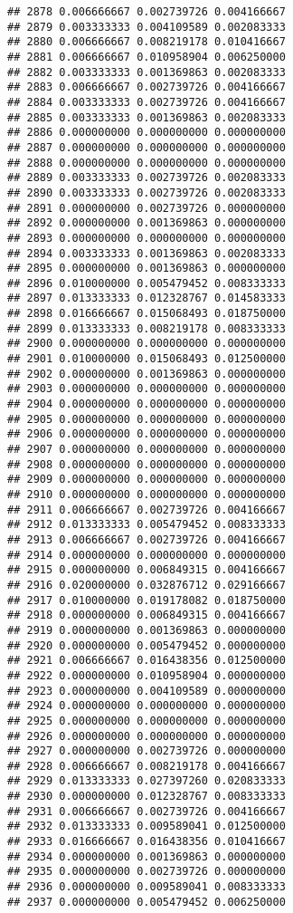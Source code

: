 \documentclass[
]{article}
\begin{document}
\begin{verbatim}
## 2878 0.006666667 0.002739726 0.004166667
## 2879 0.003333333 0.004109589 0.002083333
## 2880 0.006666667 0.008219178 0.010416667
## 2881 0.006666667 0.010958904 0.006250000
## 2882 0.003333333 0.001369863 0.002083333
## 2883 0.006666667 0.002739726 0.004166667
## 2884 0.003333333 0.002739726 0.004166667
## 2885 0.003333333 0.001369863 0.002083333
## 2886 0.000000000 0.000000000 0.000000000
## 2887 0.000000000 0.000000000 0.000000000
## 2888 0.000000000 0.000000000 0.000000000
## 2889 0.003333333 0.002739726 0.002083333
## 2890 0.003333333 0.002739726 0.002083333
## 2891 0.000000000 0.002739726 0.000000000
## 2892 0.000000000 0.001369863 0.000000000
## 2893 0.000000000 0.000000000 0.000000000
## 2894 0.003333333 0.001369863 0.002083333
## 2895 0.000000000 0.001369863 0.000000000
## 2896 0.010000000 0.005479452 0.008333333
## 2897 0.013333333 0.012328767 0.014583333
## 2898 0.016666667 0.015068493 0.018750000
## 2899 0.013333333 0.008219178 0.008333333
## 2900 0.000000000 0.000000000 0.000000000
## 2901 0.010000000 0.015068493 0.012500000
## 2902 0.000000000 0.001369863 0.000000000
## 2903 0.000000000 0.000000000 0.000000000
## 2904 0.000000000 0.000000000 0.000000000
## 2905 0.000000000 0.000000000 0.000000000
## 2906 0.000000000 0.000000000 0.000000000
## 2907 0.000000000 0.000000000 0.000000000
## 2908 0.000000000 0.000000000 0.000000000
## 2909 0.000000000 0.000000000 0.000000000
## 2910 0.000000000 0.000000000 0.000000000
## 2911 0.006666667 0.002739726 0.004166667
## 2912 0.013333333 0.005479452 0.008333333
## 2913 0.006666667 0.002739726 0.004166667
## 2914 0.000000000 0.000000000 0.000000000
## 2915 0.000000000 0.006849315 0.004166667
## 2916 0.020000000 0.032876712 0.029166667
## 2917 0.010000000 0.019178082 0.018750000
## 2918 0.000000000 0.006849315 0.004166667
## 2919 0.000000000 0.001369863 0.000000000
## 2920 0.000000000 0.005479452 0.000000000
## 2921 0.006666667 0.016438356 0.012500000
## 2922 0.000000000 0.010958904 0.000000000
## 2923 0.000000000 0.004109589 0.000000000
## 2924 0.000000000 0.000000000 0.000000000
## 2925 0.000000000 0.000000000 0.000000000
## 2926 0.000000000 0.000000000 0.000000000
## 2927 0.000000000 0.002739726 0.000000000
## 2928 0.006666667 0.008219178 0.004166667
## 2929 0.013333333 0.027397260 0.020833333
## 2930 0.000000000 0.012328767 0.008333333
## 2931 0.006666667 0.002739726 0.004166667
## 2932 0.013333333 0.009589041 0.012500000
## 2933 0.016666667 0.016438356 0.010416667
## 2934 0.000000000 0.001369863 0.000000000
## 2935 0.000000000 0.002739726 0.000000000
## 2936 0.000000000 0.009589041 0.008333333
## 2937 0.000000000 0.005479452 0.006250000

\end{verbatim}
\end{document}
